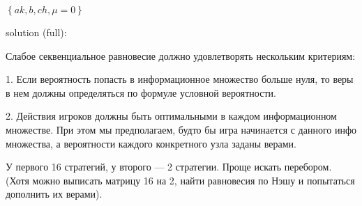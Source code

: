 \begin{solution}{6.89}

  $\left\{ak,b,ch,\mu =0\right\}$\par

solution (full): \par
Слабое секвенциальное равновесие должно удовлетворять нескольким критериям: \par
1. Если вероятность попасть в информационное множество больше нуля, то веры в нем должны определяться по формуле условной вероятности. \par
2. Действия игроков должны быть оптимальными в каждом информационном множестве. При этом мы предполагаем, будто бы игра начинается с данного инфо множества, а вероятности каждого конкретного узла заданы верами.\par

У первого 16 стратегий, у второго --- 2 стратегии. Проще искать перебором. (Хотя можно выписать матрицу 16 на 2, найти равновесия по Нэшу и попытаться дополнить их верами).\par


\end{solution}
